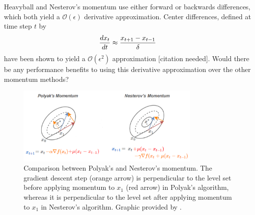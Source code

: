 \begin{research}
    Heavyball and Nesterov's momentum use either forward or backwards
    differences, which both yield a $\mathcal O(\epsilon)$ derivative approximation.
    Center differences, defined at time step $t$ by 
    \begin{equation}
        \frac{d x_t}{d t} \approx \frac{x_{t + 1} - x_{t - 1}}{\delta} 
    \end{equation}
    have been shown to yield a $\mathcal O(\epsilon^2)$ approximation [citation
    needed]. Would there be any performance benefits to using this derivative
    approximation over the other momentum methods?
\end{research}

\begin{figure}[t]
    \centering
    \includegraphics[width=0.8\textwidth]{sc1.png}
    \caption{Comparison between
    Polyak’s and Nesterov’s momentum. The gradient descent step (orange arrow)
    is perpendicular to the level set before applying momentum to $x_1$ (red
    arrow) in Polyak’s algorithm, whereas it is perpendicular to the level set
    after applying momentum to $x_1$ in Nesterov’s algorithm. Graphic provided by \citeauthor{nesterovnotes}.}
    \label{fig:sc1-png}
\end{figure}
